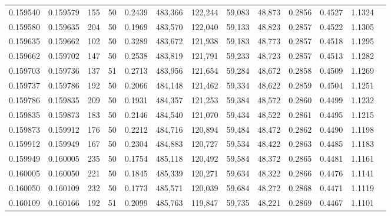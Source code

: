 \begin{tabular}{rrrrrrrrrrrrr}
0.159540 & 0.159579 &   155 &  50 &                                     0.2439 & 483,366 & 122,244 &  59,083 &  48,873 & 0.2856 & 0.4527 & 1.1324 \\
0.159580 & 0.159635 &   204 &  50 &                                     0.1969 & 483,570 & 122,040 &  59,133 &  48,823 & 0.2857 & 0.4522 & 1.1305 \\
0.159635 & 0.159662 &   102 &  50 &                                     0.3289 & 483,672 & 121,938 &  59,183 &  48,773 & 0.2857 & 0.4518 & 1.1295 \\
0.159662 & 0.159702 &   147 &  50 &                                     0.2538 & 483,819 & 121,791 &  59,233 &  48,723 & 0.2857 & 0.4513 & 1.1282 \\
0.159703 & 0.159736 &   137 &  51 &                                     0.2713 & 483,956 & 121,654 &  59,284 &  48,672 & 0.2858 & 0.4509 & 1.1269 \\
0.159737 & 0.159786 &   192 &  50 &                                     0.2066 & 484,148 & 121,462 &  59,334 &  48,622 & 0.2859 & 0.4504 & 1.1251 \\
0.159786 & 0.159835 &   209 &  50 &                                     0.1931 & 484,357 & 121,253 &  59,384 &  48,572 & 0.2860 & 0.4499 & 1.1232 \\
0.159835 & 0.159873 &   183 &  50 &                                     0.2146 & 484,540 & 121,070 &  59,434 &  48,522 & 0.2861 & 0.4495 & 1.1215 \\
0.159873 & 0.159912 &   176 &  50 &                                     0.2212 & 484,716 & 120,894 &  59,484 &  48,472 & 0.2862 & 0.4490 & 1.1198 \\
0.159912 & 0.159949 &   167 &  50 &                                     0.2304 & 484,883 & 120,727 &  59,534 &  48,422 & 0.2863 & 0.4485 & 1.1183 \\
0.159949 & 0.160005 &   235 &  50 &                                     0.1754 & 485,118 & 120,492 &  59,584 &  48,372 & 0.2865 & 0.4481 & 1.1161 \\
0.160005 & 0.160050 &   221 &  50 &                                     0.1845 & 485,339 & 120,271 &  59,634 &  48,322 & 0.2866 & 0.4476 & 1.1141 \\
0.160050 & 0.160109 &   232 &  50 &                                     0.1773 & 485,571 & 120,039 &  59,684 &  48,272 & 0.2868 & 0.4471 & 1.1119 \\
0.160109 & 0.160166 &   192 &  51 &                                     0.2099 & 485,763 & 119,847 &  59,735 &  48,221 & 0.2869 & 0.4467 & 1.1101 \\

\end{tabular}
